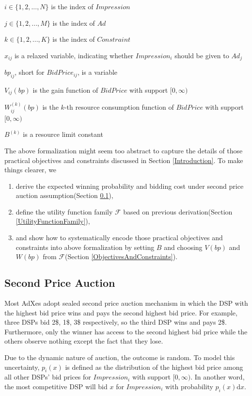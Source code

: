 \documentclass[sigconf]{acmart}
\newcommand{\sx}{x_{ij}}
\newcommand{\sbp}{bp_{ij}}
\newcommand{\sV}{V_{ij}}
\newcommand{\sW}{W_{ij}^{(k)}}
\newcommand{\sB}{B^{(k)}}
\newcommand{\inRange}[1]{\in\{1,2,...,#1\}}
\newcommand{\uff}{\mathscr{F}}
\begin{document}
$i \inRange{N}$ is the index of $Impression$

$j \inRange{M}$ is the index of $Ad$

$k \inRange{K}$ is the index of $Constraint$

$\sx$ is a relaxed variable, indicating whether $Impression_i$ should be given to $Ad_j$

$\sbp$, short for $BidPrice_{ij}$, is a variable

$\sV(bp)$ is the gain function of $BidPrice$ with support $[0, \infty)$

$\sW(bp)$ is the $k$-th resource consumption function of $BidPrice$ with support $[0, \infty)$

$\sB$ is a resource limit constant

The above formalization might seem too abstract to capture the details of
    those practical objectives and constraints discussed in Section \ref{Introduction}.
To make things clearer, we
\begin{enumerate}
\item derive the expected winning probability and bidding cost under second price auction assumption(Section \ref{SecondPriceAuction}),
\item define the utility function family $\uff$ based on previous derivation(Section \ref{UtilityFunctionFamily}),
\item and show how to systematically encode those practical objectives and constraints into above formalization
    by setting $B$ and choosing $V(bp)$ and $W(bp)$ from $\uff$(Section \ref{ObjectivesAndConstraints}).
\end{enumerate}

\subsection{Second Price Auction} \label{SecondPriceAuction}

Most AdXes adopt sealed second price auction mechanism in which
    the DSP with the highest bid price wins and pays the second highest bid price.
For example, three DSPs bid 2\$, 1\$, 3\$ respectively, so the third DSP wins and pays 2\$. 
Furthermore, only the winner has access to the second highest bid price
    while the others observe nothing except the fact that they lose.

Due to the dynamic nature of auction, the outcome is random.
To model this uncertainty, $p_i(x)$ is defined as
    the distribution of the highest bid price among all other DSPs' bid prices for $Impression_i$ with support $[0, \infty)$.
In another word, the most competitive DSP will bid $x$ for $Impression_i$ with probability $p_i(x) \mathrm{d} x$.
\end{document}
